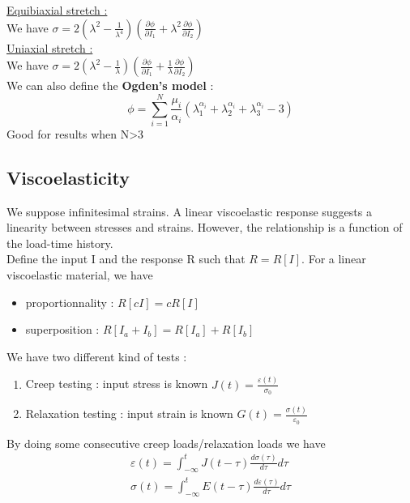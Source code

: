 \documentclass[../main.tex]{subfiles}
\begin{document}
\quad \underline{Equibiaxial stretch :}\\
We have $\sigma =  2(\lambda^2 - \frac{1}{\lambda^4}) (\frac{\partial \phi}{\partial I_1} + \lambda^2 \frac{\partial \phi}{\partial I_2})$\\

\quad \underline{Uniaxial stretch :}\\
We have $\sigma = 2(\lambda^2 - \frac{1}{\lambda}) (\frac{\partial \phi}{\partial I_1} + \frac{1}{\lambda} \frac{\partial \phi}{\partial I_2})$\\


We can also define the \textbf{Ogden's model} : \begin{equation}
    \phi = \sum_{i=1}^N \frac{\mu_i}{\alpha_i} (\lambda_1^{\alpha_i} + \lambda_2^{\alpha_i} + \lambda_3^{\alpha_i}-3)
\end{equation}
Good for results when N>3\\

\subsection{Viscoelasticity}

We suppose infinitesimal strains. A linear viscoelastic response suggests a linearity between stresses and strains. However, the relationship is a function of the load-time history.\\

Define the input I and the response R such that $R = R[I]$. For a linear viscoelastic material, we have \begin{itemize}
    \item proportionnality : $R[cI] = cR[I]$\\
    \item superposition : $R[I_a + I_b] = R[I_a] + R[I_b]$\\
\end{itemize}

We have two different kind of tests : \begin{enumerate}
    \item Creep testing : input stress is known $J(t) = \frac{\varepsilon(t)}{\sigma_0}$\\
    \item Relaxation testing : input strain is known $G(t) = \frac{\sigma(t)}{\varepsilon_0}$\\
\end{enumerate}

By doing some consecutive creep loads/relaxation loads we have \begin{equation}
    \begin{gathered}
        \varepsilon(t) = \int_{-\infty}^t J(t-\tau) \frac{d\sigma(\tau)}{d\tau}d\tau\\
        \sigma(t) = \int_{-\infty}^t E(t-\tau) \frac{d\varepsilon(\tau)}{d\tau} d\tau\\
    \end{gathered}
\end{equation}
\end{document}
